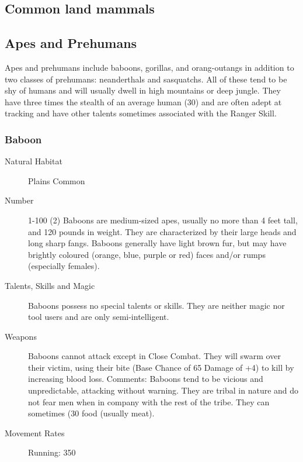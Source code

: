 \begin{multicols}{2}

\setlength\columnseprule{0.2mm}

\section{Common land mammals}

\subsection{Apes and Prehumans}
Apes and prehumans include baboons, gorillas, and orang-outangs in
addition to two classes of prehumans: neanderthals and sasquatchs. All
of these tend to be shy of humans and will usually dwell in high
mountains or deep jungle.  They have three times the stealth of an
average human (30) and are often adept at tracking and have other
talents sometimes associated with the Ranger Skill.

\subsubsection{Baboon}

\begin{description}
\item[Natural Habitat] Plains Common

\item[Number] 1-100 (2) Baboons are medium-sized apes, usually no more than 4
feet tall, and 120 pounds in weight. They are characterized by their
large heads and long sharp fangs.  Baboons generally have light brown
fur, but may have brightly coloured (orange, blue, purple or red)
faces and/or rumps (especially females).

\item[Talents, Skills and Magic] Baboons possess no special talents or skills. They are
neither magic nor tool users and are only semi-intelligent.

\item[Weapons] Baboons cannot attack except in Close Combat.  They will
swarm over their victim, using their bite (Base Chance of 65%
Damage of +4) to kill by increasing blood loss.  Comments: Baboons
tend to be vicious and unpredictable, attacking without warning. They
are tribal in nature and do not fear men when in company with the rest
of the tribe.  They can sometimes (30%
food (usually meat).


\item[Movement Rates] Running: 350


\end{description}
\end{multicols}
